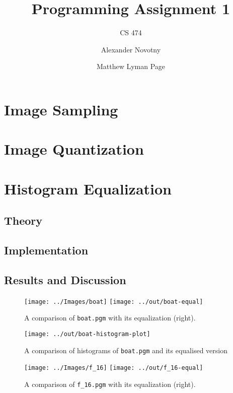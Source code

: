 \documentclass[headings=optiontoheadandtoc,listof=totoc]{scrartcl}
\title{Programming Assignment 1}
\subtitle{CS 474}
\author{Alexander Novotny \and Matthew Lyman Page}
\begin{document}
\maketitle
\tableofcontents

\newpage

\section{Image Sampling}

\section{Image Quantization}

\section{Histogram Equalization}

\subsection{Theory}

\subsection{Implementation}

\subsection{Results and Discussion}
\label{sec:equalization-results}

\begin{figure}[H]
	\centering
	\texttt{[image: ../Images/boat]}
	\texttt{[image: ../out/boat-equal]}
	\caption{A comparison of \texttt{boat.pgm} with its equalization (right).}
\end{figure}

\begin{figure}[H]
	\centering\texttt{[image: ../out/boat-histogram-plot]}
	\caption{A comparison of histograms of \texttt{boat.pgm} and its equalised version}
\end{figure}

\begin{figure}[H]
	\centering
	\texttt{[image: ../Images/f\_16]}
	\texttt{[image: ../out/f\_16-equal]}
	\caption{A comparison of \texttt{f\_16.pgm} with its equalization (right).}
\end{figure}
\end{document}
